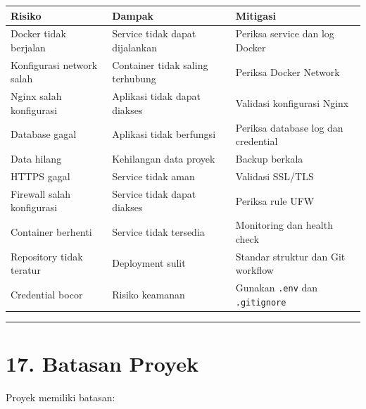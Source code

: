 \documentclass[
]{article}
\begin{document}
\begin{longtable}[]{@{}
  >{\raggedright\arraybackslash}p{}
  >{\raggedright\arraybackslash}p{}
  >{\raggedright\arraybackslash}p{}@{}}
\toprule\noalign{}
\begin{minipage}[b]{\linewidth}\raggedright
Risiko
\end{minipage} & \begin{minipage}[b]{\linewidth}\raggedright
Dampak
\end{minipage} & \begin{minipage}[b]{\linewidth}\raggedright
Mitigasi
\end{minipage} \\
\midrule\noalign{}
\endhead
\bottomrule\noalign{}
\endlastfoot
Docker tidak berjalan & Service tidak dapat dijalankan & Periksa service
dan log Docker \\
Konfigurasi network salah & Container tidak saling terhubung & Periksa
Docker Network \\
Nginx salah konfigurasi & Aplikasi tidak dapat diakses & Validasi
konfigurasi Nginx \\
Database gagal & Aplikasi tidak berfungsi & Periksa database log dan
credential \\
Data hilang & Kehilangan data proyek & Backup berkala \\
HTTPS gagal & Service tidak aman & Validasi SSL/TLS \\
Firewall salah konfigurasi & Service tidak dapat diakses & Periksa rule
UFW \\
Container berhenti & Service tidak tersedia & Monitoring dan health
check \\
Repository tidak teratur & Deployment sulit & Standar struktur dan Git
workflow \\
Credential bocor & Risiko keamanan & Gunakan \texttt{.env} dan
\texttt{.gitignore} \\
\end{longtable}

\begin{center}\rule{0.5\linewidth}{0.5pt}\end{center}

\section{17. Batasan Proyek}\label{batasan-proyek}

Proyek memiliki batasan:
\end{document}
